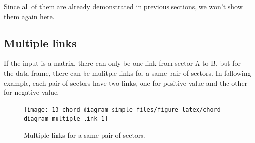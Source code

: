 \documentclass[]{book}
\newenvironment{Shaded}{\begin{snugshade}}{\end{snugshade}}
\newcommand{\KeywordTok}[1]{\textcolor[rgb]{0.13,0.29,0.53}{\textbf{#1}}}
\newcommand{\DataTypeTok}[1]{\textcolor[rgb]{0.13,0.29,0.53}{#1}}
\newcommand{\DecValTok}[1]{\textcolor[rgb]{0.00,0.00,0.81}{#1}}
\newcommand{\StringTok}[1]{\textcolor[rgb]{0.31,0.60,0.02}{#1}}
\newcommand{\OtherTok}[1]{\textcolor[rgb]{0.56,0.35,0.01}{#1}}
\newcommand{\OperatorTok}[1]{\textcolor[rgb]{0.81,0.36,0.00}{\textbf{#1}}}
\newcommand{\NormalTok}[1]{#1}
\begin{document}
Since all of them are already demonstrated in previous sections, we
won't show them again here.

\subsection{Multiple links}\label{multiple-links}

If the input is a matrix, there can only be one link from sector A to B,
but for the data frame, there can be mulitple links for a same pair of
sectors. In following example, each pair of sectors have two links, one
for positive value and the other for negative value.

\begin{Shaded}
\end{Shaded}

\begin{figure}

{\centering \texttt{[image: 13-chord-diagram-simple\_files/figure-latex/chord-diagram-multiple-link-1]} 

}

\caption{Multiple links for a same pair of sectors.}\label{fig:chord-diagram-multiple-link}
\end{figure}
\end{document}
